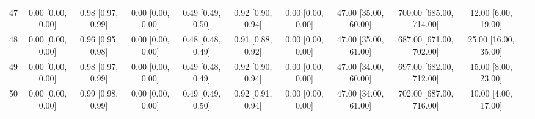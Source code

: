 \documentclass[8pt]{article}
\begin{document}
\begin{center}
\begin{footnotesize}
\begin{longtable}{|ccccccccccc|}
 47 &  0.00 [0.00, 0.00] &  0.98 [0.97, 0.99] &  0.00 [0.00, 0.00] &  0.49 [0.49, 0.50] &  0.92 [0.90, 0.94] &     0.00 [0.00, 0.00] &  47.00 [35.00, 60.00] &  700.00 [685.00, 714.00] &      12.00 [6.00, 19.00] \\
 48 &  0.00 [0.00, 0.00] &  0.96 [0.95, 0.98] &  0.00 [0.00, 0.00] &  0.48 [0.48, 0.49] &  0.91 [0.88, 0.92] &     0.00 [0.00, 0.00] &  47.00 [35.00, 61.00] &  687.00 [671.00, 702.00] &     25.00 [16.00, 35.00] \\
 49 &  0.00 [0.00, 0.00] &  0.98 [0.97, 0.99] &  0.00 [0.00, 0.00] &  0.49 [0.48, 0.49] &  0.92 [0.90, 0.94] &     0.00 [0.00, 0.00] &  47.00 [34.00, 60.00] &  697.00 [682.00, 712.00] &      15.00 [8.00, 23.00] \\
 50 &  0.00 [0.00, 0.00] &  0.99 [0.98, 0.99] &  0.00 [0.00, 0.00] &  0.49 [0.49, 0.50] &  0.92 [0.91, 0.94] &     0.00 [0.00, 0.00] &  47.00 [34.00, 61.00] &  702.00 [687.00, 716.00] &      10.00 [4.00, 17.00] \\
\end{longtable}
\end{footnotesize}
\end{center}
\end{document}
